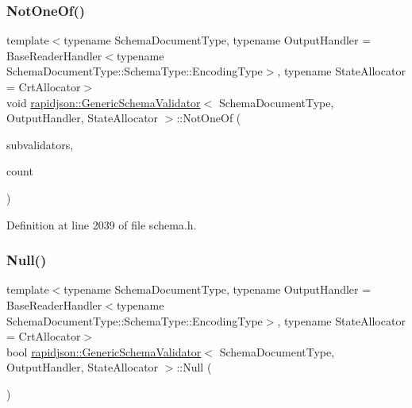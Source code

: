 \subsubsection{\texorpdfstring{NotOneOf()}{NotOneOf()}}
{\footnotesize\ttfamily template$<$typename Schema\+Document\+Type, typename Output\+Handler = Base\+Reader\+Handler$<$typename Schema\+Document\+Type\+::\+Schema\+Type\+::\+Encoding\+Type$>$, typename State\+Allocator = Crt\+Allocator$>$ \\
void \mbox{\hyperlink{classrapidjson_1_1_generic_schema_validator}{rapidjson\+::\+Generic\+Schema\+Validator}}$<$ Schema\+Document\+Type, Output\+Handler, State\+Allocator $>$\+::Not\+One\+Of (\begin{DoxyParamCaption}\item[{I\+Schema\+Validator $\ast$$\ast$}]{subvalidators,  }\item[{\mbox{\hyperlink{namespacerapidjson_a44eb33eaa523e36d466b1ced64b85c84}{Size\+Type}}}]{count }\end{DoxyParamCaption})}



Definition at line 2039 of file schema.\+h.


\begin{DoxyCode}{0}

\end{DoxyCode}
\mbox{\label{classrapidjson_1_1_generic_schema_validator_aefcbbbdba183ef7b13347aa3b4f352bd}} 
\subsubsection{\texorpdfstring{Null()}{Null()}}
{\footnotesize\ttfamily template$<$typename Schema\+Document\+Type, typename Output\+Handler = Base\+Reader\+Handler$<$typename Schema\+Document\+Type\+::\+Schema\+Type\+::\+Encoding\+Type$>$, typename State\+Allocator = Crt\+Allocator$>$ \\
bool \mbox{\hyperlink{classrapidjson_1_1_generic_schema_validator}{rapidjson\+::\+Generic\+Schema\+Validator}}$<$ Schema\+Document\+Type, Output\+Handler, State\+Allocator $>$\+::Null (\begin{DoxyParamCaption}{ }\end{DoxyParamCaption})}



